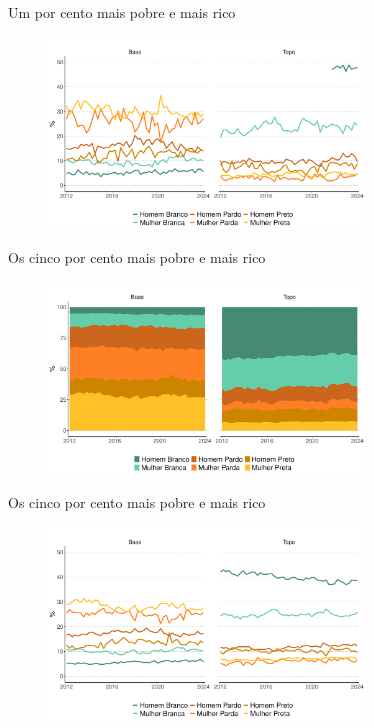 \documentclass[10pt, xcolor=x11names,compress]{beamer}
\begin{document}
			\begin{frame}{Um por cento mais pobre e mais rico}
		\begin{figure}
			\centering
			\includegraphics[width = 0.75\textwidth]{figures_output/base_topo_1_ppb_linha.pdf}
		\end{figure}
	\end{frame}
	
	\begin{frame}{Os cinco por cento mais pobre e mais rico}
		\begin{figure}
			\centering
			\includegraphics[width = 0.75\textwidth]{figures_output/base_topo_5_ppb.pdf}
		\end{figure}
	\end{frame}
	
		\begin{frame}{Os cinco por cento mais pobre e mais rico}
		\begin{figure}
			\centering
			\includegraphics[width = 0.75\textwidth]{figures_output/base_topo_5_ppb_linha.pdf}
		\end{figure}
	\end{frame}
	
\end{document}
